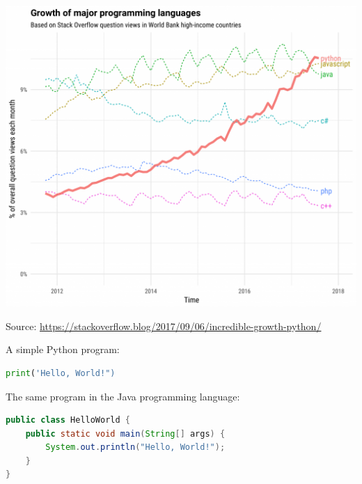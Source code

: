 \documentclass[aspectratio=169,usenames,dvipsnames]{beamer}
\begin{document}
\begin{frame}

    \centering
    \includegraphics[height=0.9\textheight]{fig/pythongrowth.png}

    Source: \url{https://stackoverflow.blog/2017/09/06/incredible-growth-python/}
\end{frame}

\begin{frame}[fragile]
A simple Python program:
\begin{lstlisting}[language=python]
print('Hello, World!")
\end{lstlisting}

\pause
\vspace{1em}
The same program in the Java programming language:

\begin{lstlisting}[language=java]
public class HelloWorld {
    public static void main(String[] args) {
        System.out.println("Hello, World!");
    }
}
\end{lstlisting}
\end{frame}
\end{document}
